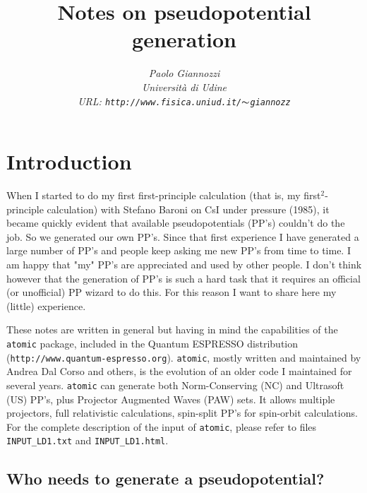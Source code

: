 \documentclass[12pt,a4paper]{article}
\begin{document}
 
\title{Notes on pseudopotential generation}
\author{\em Paolo Giannozzi\\
Universit\`a di Udine\\
URL: {\tt http://www.fisica.uniud.it/$\thicksim$giannozz}}
\maketitle
\date
{}

\tableofcontents

\section{Introduction} 

When I started to do my first first-principle calculation
(that is, my first$^2$-principle calculation) with Stefano Baroni
on CsI under pressure (1985), it became quickly evident that
available pseudopotentials (PP's) couldn't do the job. So we 
generated our own PP's. Since that first experience I have 
generated a large number of PP's and people keep asking me 
new PP's from time to time. I am happy that "my" PP's are 
appreciated and used by other people. I don't think however 
that the generation of PP's is such a hard task that it requires 
an official (or unofficial) PP wizard to do this. For this reason 
I want to share here my (little) experience.

These notes are written in general but having in mind the capabilities of
the {\tt atomic} package, included in the {\sc Quantum ESPRESSO} 
distribution 
(\texttt{http://www.quantum-espresso.org}). {\tt atomic}, mostly written
and maintained by Andrea Dal Corso and others, is the evolution of 
an older code I maintained for several years. {\tt atomic} can generate 
both Norm-Conserving (NC) \cite{NC} and Ultrasoft (US) \cite{van} PP's,
plus Projector Augmented Waves (PAW) \cite{PAW} sets.
It allows multiple projectors, full relativistic calculations,
spin-split PP's for spin-orbit calculations.
For the complete description of the input of \texttt{atomic},
please refer to files \texttt{INPUT\_LD1.txt} and 
\texttt{INPUT\_LD1.html}.

\subsection{Who needs to generate a pseudopotential?}
\end{document}
